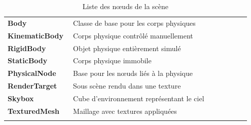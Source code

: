 \begin{longtable}{>{\bfseries}p{0.25\linewidth} p{0.7\linewidth}}
        Body & Classe de base pour les corps physiques \\
        KinematicBody & Corps physique contrôlé manuellement \\
        RigidBody & Objet physique entièrement simulé \\
        StaticBody & Corps physique immobile \\
        PhysicalNode & Base pour les nœuds liés à la physique \\
        RenderTarget & Sous scène rendu dans une texture \\
        Skybox & Cube d'environnement représentant le ciel \\
        TexturedMesh & Maillage avec textures appliquées \\
        \bottomrule
        \caption{Liste des n\oe{}uds de la scène}
        \label{tab:raptiquax_nodes}
    \end{longtable}

